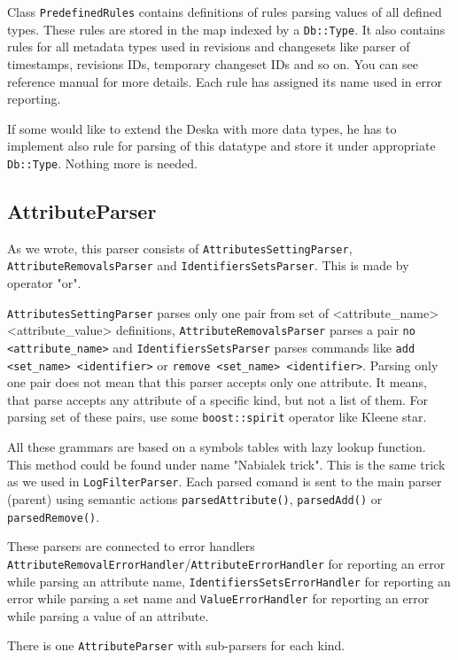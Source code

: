 \documentclass[deska]{subfiles}
\begin{document}
Class {\tt PredefinedRules} contains definitions of rules parsing values of all defined types. These rules are stored
in the map indexed by a {\tt Db::Type}. It also contains rules for all metadata types used in revisions and changesets
like parser of timestamps, revisions IDs, temporary changeset IDs and so on. You can see reference manual for more details.
Each rule has assigned its name used in error reporting.

If some would like to extend the Deska with more data types, he has to implement also rule for parsing of this datatype
and store it under appropriate {\tt Db::Type}. Nothing more is needed.

\subsection{AttributeParser}

As we wrote, this parser consists of {\tt AttributesSettingParser}, {\tt AttributeRemovalsParser} and {\tt IdentifiersSetsParser}.
This is made by operator "or".

{\tt AttributesSettingParser} parses only one pair from set of <attribute\_name> <attribute\_value> definitions, {\tt AttributeRemovalsParser}
parses a pair {\tt no <attribute\_name>} and {\tt IdentifiersSetsParser} parses commands like {\tt add <set\_name> <identifier>} or
{\tt remove <set\_name> <identifier>}. Parsing only one pair does not mean that this parser accepts only
one attribute. It means, that parse accepts any attribute of a specific kind, but not a list of them.
For parsing set of these pairs, use some {\tt boost::spirit} operator like Kleene star.

All these grammars are based on a symbols tables with lazy lookup function. This method could be found
under name "Nabialek trick". This is the same trick as we used in {\tt LogFilterParser}. Each parsed comand is sent to the
main parser (parent) using semantic actions {\tt parsedAttribute()}, {\tt parsedAdd()} or {\tt parsedRemove()}.

These parsers are connected to error handlers {\tt AttributeRemovalErrorHandler}/{\tt AttributeErrorHandler} for reporting an error
while parsing an attribute name, {\tt IdentifiersSetsErrorHandler} for reporting an error while parsing a set name and
{\tt ValueErrorHandler} for reporting an error while parsing a value of an attribute.

There is one {\tt AttributeParser} with sub-parsers for each kind.
\end{document}
